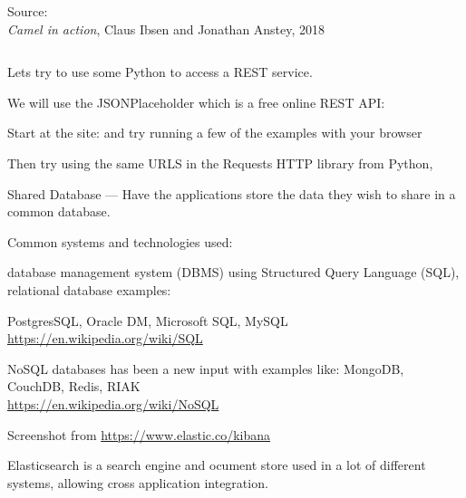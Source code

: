 \documentclass[Screen16to9,17pt]{foils}
\begin{document}
Source: {\footnotesize\\
\emph{Camel in action}, Claus Ibsen and Jonathan Anstey, 2018}


\inputminted{python}{programs/rest-1.py}

\begin{list2}
\item  Lets try to use some Python to access a REST service.
\item  We will use the JSONPlaceholder which is a free online REST API:
\item Start at the site:  and try running a few of the examples with your browser
\item Then try using the same URLS in the Requests HTTP library from Python,\\
\end{list2}



Shared Database — Have the applications store the data they wish to share in a common database.

Common systems and technologies used:
\begin{list2}
\item database management system (DBMS) using Structured Query Language (SQL), relational database examples:\\
\item PostgresSQL, Oracle DM, Microsoft SQL, MySQL
\url{https://en.wikipedia.org/wiki/SQL}
\item NoSQL databases has been a new input with examples like:
MongoDB, CouchDB, Redis, RIAK\\
\url{https://en.wikipedia.org/wiki/NoSQL}
\end{list2}







Screenshot from \url{https://www.elastic.co/kibana}

Elasticsearch is a search engine and ocument store used in a lot of different systems, allowing cross application integration.
\end{document}

